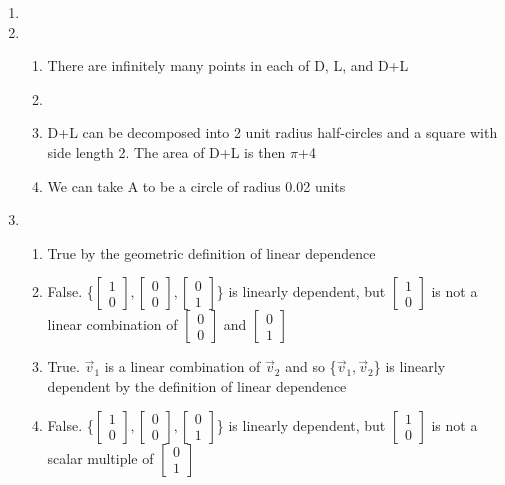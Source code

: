 \documentclass{article}
\begin{document}
\begin{solution}
\begin{enumerate}
        \item 
        \item
            \begin{enumerate}
                \item There are infinitely many points in each of D, L, and D+L
                \item 
                \item D+L can be decomposed into 2 unit radius half-circles and a square with side length 2. The area of D+L is then $\pi$+4
                \item We can take A to be a circle of radius 0.02 units
            \end{enumerate}
        \item
            \begin{enumerate}
                \item True by the geometric definition of linear dependence
                \item False. \{$\begin{bmatrix}1\\0\end{bmatrix},\begin{bmatrix}0\\0\end{bmatrix},\begin{bmatrix}0\\1\end{bmatrix}$\} is linearly dependent, but $\begin{bmatrix}1\\0\end{bmatrix}$ is not a linear combination of $\begin{bmatrix}0\\0\end{bmatrix}$ and $\begin{bmatrix}0\\1\end{bmatrix}$
                \item True. $\Vec{v}_{1}$ is a linear combination of $\Vec{v}_{2}$ and so \{$\Vec{v}_{1},\Vec{v}_{2}$\} is linearly dependent by the definition of linear dependence
                \item False. \{$\begin{bmatrix}1\\0\end{bmatrix},\begin{bmatrix}0\\0\end{bmatrix},\begin{bmatrix}0\\1\end{bmatrix}$\} is linearly dependent, but $\begin{bmatrix}1\\0\end{bmatrix}$ is not a scalar multiple of $\begin{bmatrix}0\\1\end{bmatrix}$

\end{enumerate}
\end{enumerate}
\end{solution}
\end{document}
